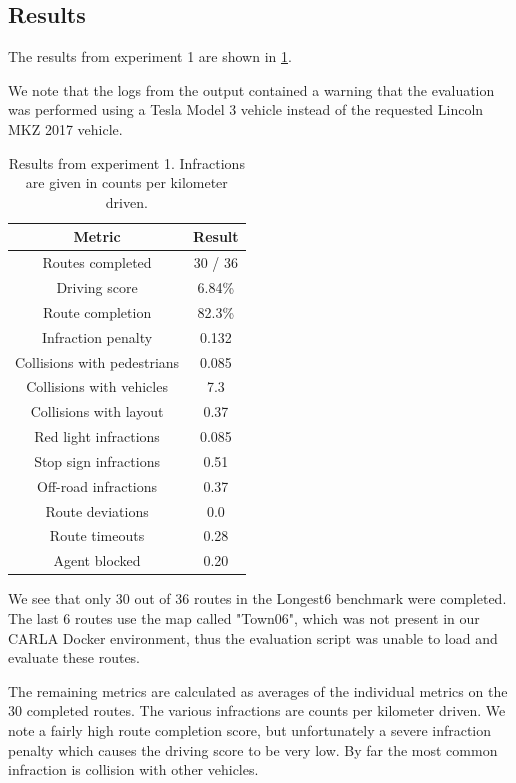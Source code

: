 \subsection{Results}

The results from experiment 1 are shown in \cref{tab:exp1:results}.

We note that the logs from the output contained a warning that the evaluation was performed using a
Tesla Model 3 vehicle instead of the requested Lincoln MKZ 2017 vehicle.

\begin{table}[]
    \centering
    \begin{tabular}{|c|c|}
        \hline
        \textbf{Metric} & \textbf{Result} \\ \hline
        Routes completed & 30 / 36 \\ \hline
        Driving score & 6.84\% \\ \hline
        Route completion & 82.3\% \\ \hline
        Infraction penalty & 0.132 \\ \hline
        Collisions with pedestrians & 0.085 \\ \hline
        Collisions with vehicles & 7.3 \\ \hline
        Collisions with layout & 0.37 \\ \hline
        Red light infractions & 0.085 \\ \hline
        Stop sign infractions & 0.51 \\ \hline
        Off-road infractions & 0.37 \\ \hline
        Route deviations & 0.0 \\ \hline
        Route timeouts & 0.28 \\ \hline
        Agent blocked & 0.20 \\ \hline
    \end{tabular}
    \caption{Results from experiment 1. Infractions are given in counts per kilometer driven.}
    \label{tab:exp1:results}
\end{table}

We see that only 30 out of 36 routes in the Longest6 benchmark were completed.
The last 6 routes use the map called "Town06",
which was not present in our CARLA Docker environment,
thus the evaluation script was unable to load and evaluate these routes.

The remaining metrics are calculated as averages of the 
individual metrics on the 30 completed routes.
The various infractions are counts per kilometer driven.
We note a fairly high route completion score,
but unfortunately a severe infraction penalty
which causes the driving score to be very low.
By far the most common infraction is collision with other vehicles.

